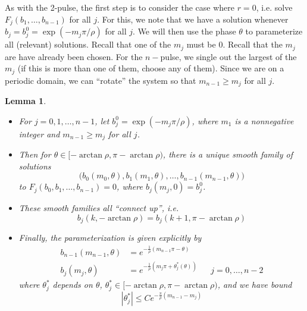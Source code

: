 \documentclass[12pt]{article}
\newtheorem{lemma}{Lemma}
\begin{document}
As with the 2-pulse, the first step is to consider the case where $r = 0$, i.e. solve $F_j(b_1, \dots, b_{n-1})$ for all $j$. For this, we note that we have a solution whenever $b_j = b_j^0 = \exp(-m_j \pi / \rho )$ for all $j$. We will then use the phase $\theta$ to parameterize all (relevant) solutions. Recall that one of the $m_j$ must be 0. Recall that the $m_j$ are have already been chosen. For the $n-$pulse, we single out the largest of the $m_j$ (if this is more than one of them, choose any of them). Since we are on a periodic domain, we can ``rotate'' the system so that $m_{n-1} \geq m_j$ for all $j$. 														
\begin{lemma}\label{thetaparam}\[\]
\begin{itemize}
\item For $j = 0, 1, \dots, n-1$, let $b_j^0 = \exp(-m_j \pi / \rho )$, where $m_1$ is a nonnegative integer and $m_{n-1} \geq m_j$ for all $j$. 
\item Then for $\theta \in [-\arctan \rho,\pi - \arctan \rho)$, there is a unique smooth family of solutions 
\[
\Big( b_0(m_0, \theta), b_1(m_1, \theta), \dots, b_{n-1}(m_{n-1}, \theta) \Big)
\]
 to $F_j(b_0, b_1, \dots, b_{n-1}) = 0$, where $b_j(m_j, 0) = b_j^0$.

\item These smooth families all ``connect up'', i.e.
\[
b_j(k, -\arctan \rho) = b_j(k+1, \pi - \arctan \rho)
\]
\item Finally, the parameterization is given explicitly by
\begin{align*}
b_{n-1}(m_{n-1}, \theta) &= e^{ -\frac{1}{\rho}(m_{n-1} \pi - \theta) } \\
b_j(m_j, \theta) &= e^{-\frac{1}{\rho} (m_j \pi + \theta^*_j(\theta)) } && j = 0, \dots, n-2
\end{align*}
where $\theta^*_j$ depends on $\theta$, $\theta_j^* \in [-\arctan \rho,\pi - \arctan \rho)$, and we have bound
\[
|\theta^*_j| \leq C e^{ -\frac{\pi}{\rho} (m_{n-1} - m_j) }
\]
\end{itemize}
\end{lemma}
\end{document}

